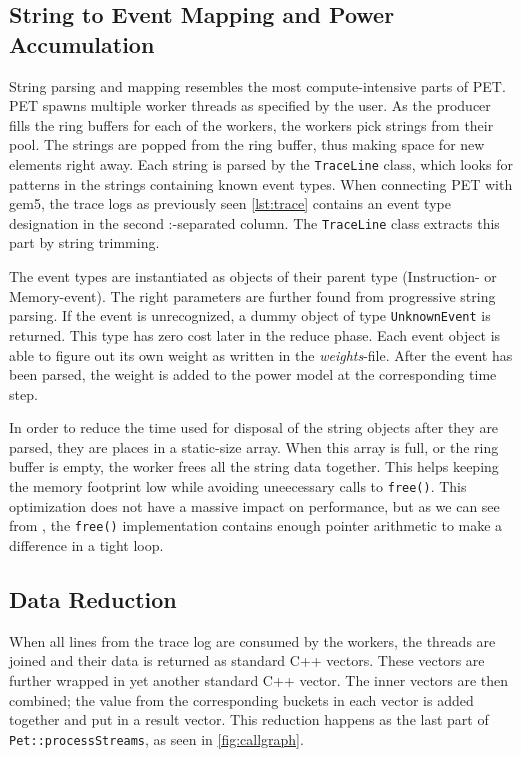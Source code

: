 \subsection{String to Event Mapping and Power Accumulation}

String parsing and mapping resembles the most compute-intensive parts of PET.
PET spawns multiple worker threads as specified by the user. As the producer
fills the ring buffers for each of the workers, the workers pick strings from
their pool. The strings are popped from the ring buffer, thus making space for
new elements right away. Each string is parsed by the \texttt{TraceLine} class,
which looks for patterns in the strings containing known event types. When
connecting PET with gem5, the trace logs as previously seen \autoref{lst:trace}
contains an event type designation in the second :-separated column. The
\texttt{TraceLine} class extracts this part by string trimming.

The event types are instantiated as objects of their parent type (Instruction-
or Memory-event). The right parameters are further found from progressive string
parsing. If the event is unrecognized, a dummy object of type
\texttt{UnknownEvent} is returned. This type has zero cost later in the reduce
phase. Each event object is able to figure out its own weight as written in the
\emph{weights}-file. After the event has been parsed, the weight is added to the
power model at the corresponding time step.

In order to reduce the time used for disposal of the string objects after they
are parsed, they are places in a static-size array. When this array is full, or
the ring buffer is empty, the worker frees all the string data together. This
helps keeping the memory footprint low while avoiding uneecessary calls to
\texttt{free()}. This optimization does not have a massive impact on
performance, but as we can see from \cite{kernighan1988c}, the \texttt{free()}
implementation contains enough pointer arithmetic to make a difference in a
tight loop.


\subsection{Data Reduction}

When all lines from the trace log are consumed by the workers, the threads are
joined and their data is returned as standard C++ vectors. These vectors are
further wrapped in yet another standard C++ vector. The inner vectors are then
combined; the value from the corresponding buckets in each vector is added
together and put in a result vector. This reduction happens as the last part
of \texttt{Pet::processStreams}, as seen in \autoref{fig:callgraph}.

